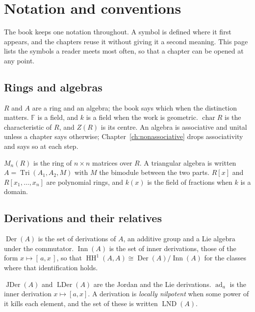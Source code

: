 \chapter*{Notation and conventions}
\label{page:notation}

The book keeps one notation throughout.
A symbol is defined where it first appears, and the chapters reuse it without
giving it a second meaning.
This page lists the symbols a reader meets most often, so that a chapter can be
opened at any point.

\section*{Rings and algebras}

$R$ and $A$ are a ring and an algebra; the book says which when the distinction
matters. $\mathbb{F}$ is a field, and $k$ is a field when the work is
geometric. $\operatorname{char}R$ is the characteristic of $R$, and $Z(R)$ is
its centre.
An algebra is associative and unital unless a chapter says otherwise;
Chapter~\ref{ch:nonassociative} drops associativity and says so at each step.

$M_n(R)$ is the ring of $n\times n$ matrices over $R$.
A triangular algebra is written $A=\operatorname{Tri}(A_1,A_2,M)$ with $M$ the
bimodule between the two parts.
$R[x]$ and $R[x_1,\dots,x_n]$ are polynomial rings, and $k(x)$ is the field of
fractions when $k$ is a domain.

\section*{Derivations and their relatives}

$\operatorname{Der}(A)$ is the set of derivations of $A$, an additive group and
a Lie algebra under the commutator.
$\operatorname{Inn}(A)$ is the set of inner derivations, those of the form
$x\mapsto[\,a,x\,]$, so that
$\operatorname{HH}^{1}(A,A)\cong\operatorname{Der}(A)/\operatorname{Inn}(A)$ for
the classes where that identification holds.

$\operatorname{JDer}(A)$ and $\operatorname{LDer}(A)$ are the Jordan and the Lie
derivations. $\operatorname{ad}_a$ is the inner derivation $x\mapsto[a,x]$.
A derivation is \emph{locally nilpotent} when some power of it kills each
element, and the set of these is written $\operatorname{LND}(A)$. %

